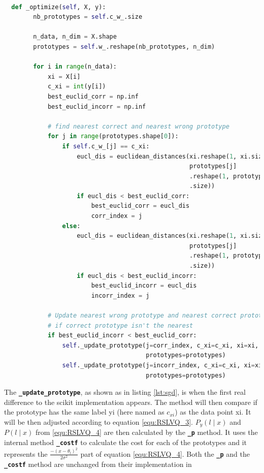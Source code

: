 \documentclass[12pt,oneside,a4paper,parskip]{scrbook}
\begin{document}
\begin{lstlisting}[label=lst:optimize,
  language=python,
  firstnumber=1,
  caption=Method \texttt{\_optimize} from the scikit-multiflow framework]			   

  def _optimize(self, X, y):
        nb_prototypes = self.c_w_.size

        n_data, n_dim = X.shape
        prototypes = self.w_.reshape(nb_prototypes, n_dim)

        for i in range(n_data):
            xi = X[i]
            c_xi = int(y[i])
            best_euclid_corr = np.inf
            best_euclid_incorr = np.inf

            # find nearest correct and nearest wrong prototype
            for j in range(prototypes.shape[0]):
                if self.c_w_[j] == c_xi:
                    eucl_dis = euclidean_distances(xi.reshape(1, xi.size),
                                                   prototypes[j]
                                                   .reshape(1, prototypes[j]
                                                   .size))
                    if eucl_dis < best_euclid_corr:
                        best_euclid_corr = eucl_dis
                        corr_index = j
                else:
                    eucl_dis = euclidean_distances(xi.reshape(1, xi.size),
                                                   prototypes[j]
                                                   .reshape(1, prototypes[j]
                                                   .size))
                    if eucl_dis < best_euclid_incorr:
                        best_euclid_incorr = eucl_dis
                        incorr_index = j

            # Update nearest wrong prototype and nearest correct prototype
            # if correct prototype isn't the nearest
            if best_euclid_incorr < best_euclid_corr:
                self._update_prototype(j=corr_index, c_xi=c_xi, xi=xi,
                                       prototypes=prototypes)
                self._update_prototype(j=incorr_index, c_xi=c_xi, xi=xi,
                                       prototypes=prototypes)
\end{lstlisting}

The \textbf{\texttt{\_update\_prototype}}, as shown as in listing \ref{lst:sgd}, is when the first real difference to the scikit implementation appears.
The method will then compare if the prototype has the same label yi (here named as $c_\textit{xi}$) as the data point xi.
It will be then adjusted according to equation \ref{equ:RSLVQ_3}. 
$P_y(l\mid x)$ and $P(l\mid x)$ from \ref{equ:RSLVQ_4} are then calculated by the \textbf{\texttt{\_p}} method.
It uses the internal method \textbf{\texttt{\_costf}} to calculate the cost for each of the prototypes and it represents
the $\frac{-(x-\theta_l)^2}{2\sigma^2}$ part of equation \ref{equ:RSLVQ_4}. 
Both the \textbf{\texttt{\_p}} and the \textbf{\texttt{\_costf}} method are unchanged from their implementation in \cite{skmultiflow}
\end{document}

